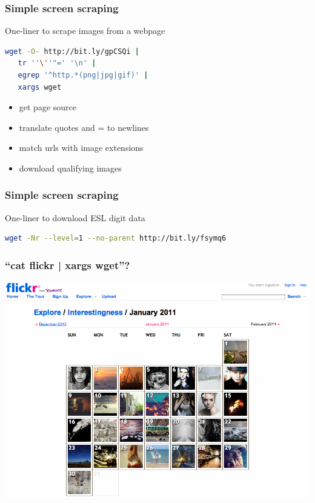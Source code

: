 \begin{frame}[fragile]
  \frametitle{Simple screen scraping}

    \begin{block}{One-liner to scrape images from a webpage}
        \begin{lstlisting}[language=bash]
 wget -O- http://bit.ly/gpCSQi | 
   tr ''\''"=' '\n' | 
   egrep '^http.*(png|jpg|gif)' | 
   xargs wget 
        \end{lstlisting}
    \end{block} 

    \pause
    \begin{itemize}
      \item get page source
      \item translate quotes and = to newlines
      \item match urls with image extensions
      \item download qualifying images
    \end{itemize}

\end{frame}


\begin{frame}[fragile]
  \frametitle{Simple screen scraping}

  \begin{center}
  \begin{block}{One-liner to download ESL digit data}
    \begin{lstlisting}[language=bash]
 wget -Nr --level=1 --no-parent http://bit.ly/fsymq6
    \end{lstlisting}
  \end{block}

  \end{center}
\end{frame}

\begin{frame}
  \frametitle{``cat flickr \big| xargs wget''?}

  \begin{center}
    \includegraphics[width=\textwidth]{flickr_201101.png}
  \end{center}

\end{frame}


